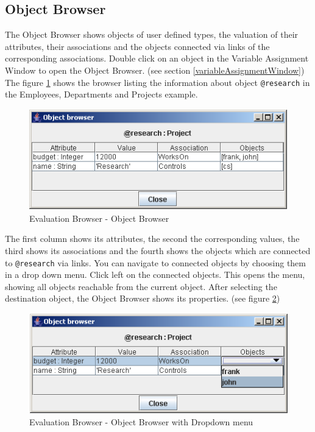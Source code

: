 \documentclass[a4paper,titlepage,oneside,final]{scrreprt} %
\begin{document}
\subsection{Object Browser}
The Object Browser shows objects of user defined types, the valuation of their attributes,
their associations and the objects connected via links of the corresponding associations.
Double click on an object in the Variable Assignment Window to open the Object Browser.
(see section \ref{variableAssignmentWindow})\\
The figure \ref{fig:EvaluationBrowserObjectBrowser} shows the browser listing the information
about object \verb+@research+ in the Employees, Departments and Projects example.
\begin{figure}[ht]
\centering
\includegraphics[scale=0.7]{Screenshots/GUI/EvalBrowserObjectBrowser.png}
\caption{Evaluation Browser - Object Browser}
\label{fig:EvaluationBrowserObjectBrowser}
\end{figure}
The first column
shows its attributes, the second the corresponding values, the third shows its
associations and the fourth shows the objects which are connected to \verb+@research+
via links. You can navigate to connected objects by choosing them in a drop down menu.
Click left on the connected objects. This opens the menu, showing all
objects reachable from the current object.
After selecting the destination object, the Object Browser shows
its properties. (see figure \ref{fig:EvaluationBrowserObjectBrowserDropDown})
\begin{figure}[ht]
\centering
\includegraphics[scale=0.7]{Screenshots/GUI/EvalBrowserObjectBrowserDropDown.png}
\caption{Evaluation Browser - Object Browser with Dropdown menu}
\label{fig:EvaluationBrowserObjectBrowserDropDown}
\end{figure}
\end{document}
